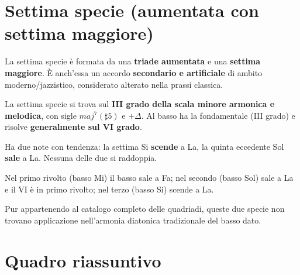 \section{Settima specie (aumentata con settima maggiore)}
\label{sec:settima_specie_dettaglio}

La settima specie è formata da una \textbf{triade aumentata} e una \textbf{settima maggiore}. È anch'essa un accordo \textbf{secondario e artificiale} di ambito moderno/jazzistico, considerato alterato nella prassi classica.

\begin{regola}
	\label{reg:settima_specie}
	La settima specie si trova sul \textbf{III grado della scala minore armonica e melodica}, con sigle $maj^7(\sharp5)$ e $+\Delta$. Al basso ha la fondamentale (III grado) e risolve \textbf{generalmente sul VI grado}.
\end{regola}

Ha due note con tendenza: la settima Si \textbf{scende} a La, la quinta eccedente Sol\diesis{} \textbf{sale} a La. Nessuna delle due si raddoppia.

\begin{esempio}
	\label{ex:settima_specie}
	Nel primo rivolto (basso Mi) il basso sale a Fa; nel secondo (basso Sol\diesis) sale a La e il VI è in primo rivolto; nel terzo (basso Si) scende a La.
\end{esempio}

Pur appartenendo al catalogo completo delle quadriadi, queste due specie non trovano applicazione nell'armonia diatonica tradizionale del basso dato.

\section{Quadro riassuntivo}
\label{sec:quadro_specie}

